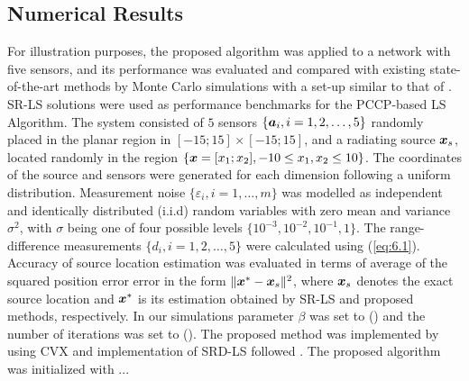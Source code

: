 \label{eq:6.5} %

\subsection{Numerical Results}

For illustration purposes, the proposed algorithm was applied to a network with five sensors, and its performance was evaluated and compared with existing state-of-the-art methods by Monte Carlo simulations with a set-up similar to that of \cite{BeckStLi}. SR-LS solutions were used as performance benchmarks for the PCCP-based LS Algorithm. The system consisted of $5$ sensors $\{\mbox{\boldmath$a$}_i, i = 1, 2,\ldots,5\}$ randomly placed in the planar region in $[-15;15]\times[-15;15]$, and a radiating source $\mbox{\boldmath$x$}_s$, located randomly in the region $\{\mbox{\boldmath$x$}=[x_1;x_2], -10\leq x_1,x_2\leq 10\}$. The coordinates of the source and sensors were generated for each dimension following a uniform distribution. Measurement noise $\{\varepsilon_i, i=1,\ldots,m\}$ was modelled as independent and identically distributed (i.i.d) random variables with zero mean and variance $\sigma^2$, with $\sigma$ being one of four possible levels $\{10^{-3}, 10^{-2}, 10^{-1}, 1\}$.  The range-difference measurements $\{d_i, i=1, 2,\ldots,5\}$ were calculated using (\ref{eq:6.1}). Accuracy of source location estimation was evaluated in terms of average of the squared position error error in the form $\|\mbox{\boldmath$x$}^*-\mbox{\boldmath$x$}_s\|^2$, where $\mbox{\boldmath$x$}_s$ denotes the exact source location and $\mbox{\boldmath$x$}^*$ is its estimation obtained by SR-LS and proposed methods, respectively.  
In our simulations parameter $\beta$ was set to () and the number of iterations was set to (). The proposed method was implemented by using  CVX  \cite{cvx} and implementation of SRD-LS followed \cite{BeckStLi}. The proposed algorithm was initialized with ...  